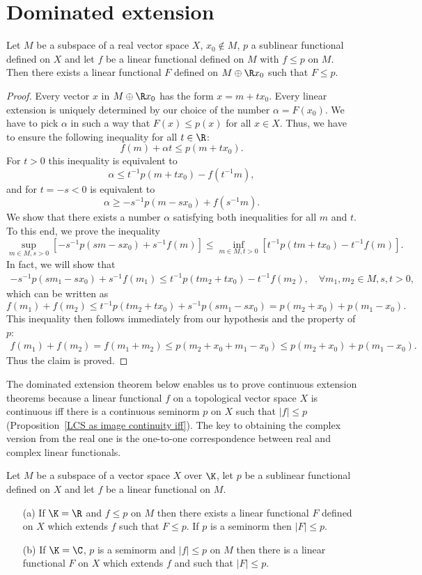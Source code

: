 \section{Dominated extension}
\begin{proposition}
Let $M$ be a subspace of a real vector space $X$, $x_0\notin M$, $p$ a sublinear functional defined on $X$ and let $f$ be a linear functional defined on $M$ with $f\leq p$ on $M$. Then there exists a linear functional $F$ defined on $M\oplus\R x_0$ such that $F\leq p$.
\end{proposition}
\begin{proof}
Every vector $x$ in $M\oplus\R x_0$ has the form $x=m+tx_0$. Every linear extension is uniquely determined by our choice of the number $\alpha=F(x_0)$. We have to pick $\alpha$ in such a way that $F(x)\leq p(x)$ for all $x\in X$. Thus, we have to ensure the following inequality for all $t\in\R$:
\[f(m)+\alpha t\leq p(m+tx_0).\]
For $t>0$ this inequality is equivalent to
\[\alpha\leq t^{-1}p(m+tx_0)-f(t^{-1}m),\]
and for $t=-s<0$ is equivalent to
\[\alpha\geq -s^{-1}p(m-sx_0)+f(s^{-1}m).\]
We show that there exists a number $\alpha$ satisfying both inequalities for all $m$ and $t$. To this end, we prove the inequality
\[\sup_{m\in M,s>0}[-s^{-1}p(sm-sx_0)+s^{-1}f(m)]\leq \inf_{m\in M,t>0}[t^{-1}p(tm+tx_0)-t^{-1}f(m)].\]
In fact, we will show that
\begin{align*}
-s^{-1}p(sm_1-sx_0)+s^{-1}f(m_1)\leq t^{-1}p(tm_2+tx_0)-t^{-1}f(m_2),\quad \forall m_1,m_2\in M,s,t>0,
\end{align*}
which can be written as
\[f(m_1)+f(m_2)\leq t^{-1}p(tm_2+tx_0)+s^{-1}p(sm_1-sx_0)=p(m_2+x_0)+p(m_1-x_0).\]
This inequality then follows immediately from our hypothesis and the property of $p$:
\begin{align*}
f(m_1)+f(m_2)=f(m_1+m_2)\leq p(m_2+x_0+m_1-x_0)\leq p(m_2+x_0)+p(m_1-x_0).
\end{align*}
Thus the claim is proved.
\end{proof}
The dominated extension theorem below enables us to prove continuous extension theorems because a linear functional $f$ on a topological vector space $X$ is continuous iff there is a continuous seminorm $p$ on $X$ such that $|f|\leq p$ (Proposition~\ref{LCS as image continuity iff}). The key to obtaining the complex version from the real one is the one-to-one correspondence between real and complex linear functionals.
\begin{theorem}\label{Hahn-Banach dominated extension}
Let $M$ be a subspace of a vector space $X$ over $\K$, let $p$ be a sublinear functional defined on $X$ and let $f$ be a linear functional on $M$.
\begin{itemize}
\item[(a)] If $\K=\R$ and $f\leq p$ on $M$ then there exists a linear functional $F$ defined on $X$ which extends $f$ such that $F\leq p$. If $p$ is a seminorm then $|F|\leq p$.
\item[(b)] If $\K=\C$, $p$ is a seminorm and $|f|\leq p$ on $M$ then there is a linear functional $F$ on $X$ which extends $f$ and such that $|F|\leq p$.
\end{itemize}
\end{theorem}
